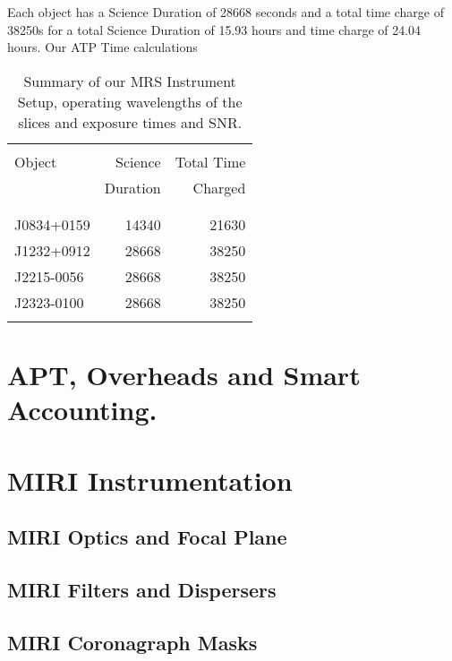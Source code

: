 Each object has a Science Duration of 28668 seconds and a total time charge of 38250s 
for a total Science Duration of  15.93 hours and time charge of 24.04 hours. 
Our ATP Time calculations
\begin{table}
\begin{center}
\begin{tabular}{|| l | r | r ||}
  \hline\hline
  &&& \\
  Object   	& 	Science           & Total Time          \\
         	        &      Duration        & Charged \\
  &&& \\
  \hline
  &&& \\
  J0834+0159  &       14340                & 21630   \\
  J1232+0912 &     28668         & 38250 \\
J2215-0056&      28668  &         38250 \\
J2323-0100 &      28668   &       38250 \\
  &&& \\
  \hline\hline
\end{tabular}
\caption{Summary of our MRS Instrument Setup, 
  operating wavelengths of the slices and exposure 
  times and SNR. 
}
\label{tab:ETC_calcs} 
\end{center}
\end{table}







\section{APT, Overheads and Smart Accounting.}
\section{MIRI Instrumentation}
    \subsection{MIRI Optics and Focal Plane}
    \subsection{MIRI Filters and Dispersers}
    \subsection{MIRI Coronagraph Masks}

